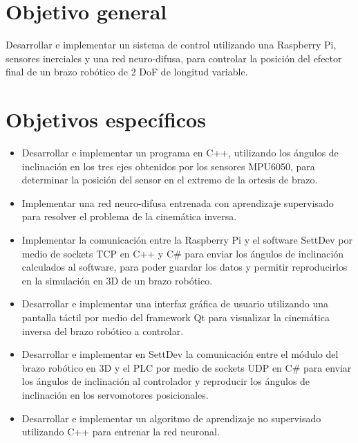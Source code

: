 \section{Objetivo general}

Desarrollar e implementar un sistema de control utilizando una Raspberry Pi, sensores inerciales y una red neuro-difusa, para controlar la posición del efector final de un brazo robótico de 2 DoF de longitud variable.

\newpage
\section{Objetivos específicos}
\begin{itemize}
	
	\item Desarrollar e implementar un programa en C++, utilizando los ángulos de inclinación en los tres ejes obtenidos por los sensores MPU6050, para determinar la posición del sensor en el extremo de la ortesis de brazo.
	
	\item Implementar una red neuro-difusa entrenada con aprendizaje supervisado para resolver el problema de la cinemática inversa.
	
	\item Implementar la comunicación entre la Raspberry Pi y el software SettDev por medio de sockets TCP en C++ y C\# para enviar los ángulos de inclinación calculados al software, para poder guardar los datos y permitir reproducirlos en la simulación en 3D de un brazo robótico.
	
	\item Desarrollar e implementar una interfaz gráfica de usuario utilizando una pantalla táctil por medio del framework Qt para visualizar la cinemática inversa del brazo robótico a controlar.
	
	\item Desarrollar e implementar en SettDev la comunicación entre el módulo del brazo robótico en 3D y el PLC por medio de sockets UDP en C\# para enviar los ángulos de inclinación al controlador y reproducir los ángulos de inclinación en los servomotores posicionales.
	
	\item Desarrollar e implementar un algoritmo de aprendizaje no supervisado utilizando C++ para entrenar la red neuronal.
	
\end{itemize}